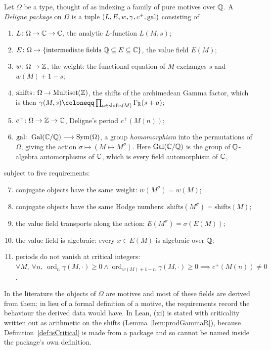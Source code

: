 \begin{definition}
  \label{def:pkg}
  \leanok
  Let $\Omega$ be a type, thought of as indexing a family of pure motives over $\mathbb{Q}$.
  A \emph{Deligne package} on $\Omega$ is a tuple $(L, E, w, \gamma, c^{+}, \mathrm{gal})$ consisting of
  \begin{enumerate}
    \item $L \colon \Omega \to \mathbb{C} \to \mathbb{C}$, the analytic $L$-function $L(M,s)$;
    \item $E \colon \Omega \to \{\text{intermediate fields } \mathbb{Q} \subseteq E \subseteq \mathbb{C}\}$,
      the value field $E(M)$;
    \item $w \colon \Omega \to \mathbb{Z}$, the weight: the functional equation of $M$ exchanges $s$
      and $w(M)+1-s$;
    \item $\mathrm{shifts} \colon \Omega \to \operatorname{Multiset}(\mathbb{Z})$, the shifts of the
      archimedean Gamma factor, which is then
      $\gamma(M,s) \coloneqq \prod_{a \in \mathrm{shifts}(M)} \Gamma_{\R}(s+a)$;
    \item $c^{+} \colon \Omega \to \mathbb{Z} \to \mathbb{C}$, Deligne's period $c^{+}(M(n))$;
    \item $\mathrm{gal} \colon \operatorname{Gal}(\mathbb{C}/\mathbb{Q}) \longrightarrow \operatorname{Sym}(\Omega)$,
      a group \emph{homomorphism} into the permutations of $\Omega$, giving the action
      $\sigma \mapsto (M \mapsto M^{\sigma})$. Here $\operatorname{Gal}(\mathbb{C}/\mathbb{Q})$ is the group
      of $\mathbb{Q}$-algebra automorphisms of $\mathbb{C}$, which is every field automorphism of $\mathbb{C}$,
  \end{enumerate}
  subject to five requirements:
  \begin{enumerate}
    \setcounter{enumi}{6}
    \item conjugate objects have the same weight: $w(M^{\sigma}) = w(M)$;
    \item conjugate objects have the same Hodge numbers:
      $\mathrm{shifts}(M^{\sigma}) = \mathrm{shifts}(M)$;
    \item the value field transports along the action:
      $E(M^{\sigma}) = \sigma\!\left(E(M)\right)$;
    \item the value field is algebraic: every $x \in E(M)$ is algebraic over $\mathbb{Q}$;
    \item periods do not vanish at critical integers:
      $\forall M,\ \forall n,\ \operatorname{ord}_{n}\gamma(M,\cdot) \geq 0 \wedge
      \operatorname{ord}_{w(M)+1-n}\gamma(M,\cdot) \geq 0 \implies c^{+}(M(n)) \neq 0$.
  \end{enumerate}
  In the literature the objects of $\Omega$ are motives and most of these fields are derived
  from them; in lieu of a formal definition of a motive, the requirements record the behaviour
  the derived data would have. In Lean, (xi) is stated with criticality written out as arithmetic
  on the shifts (Lemma~\ref{lem:prodGammaR}), because Definition~\ref{def:isCritical} is made
  from a package and so cannot be named inside the package's own definition.
\end{definition}


